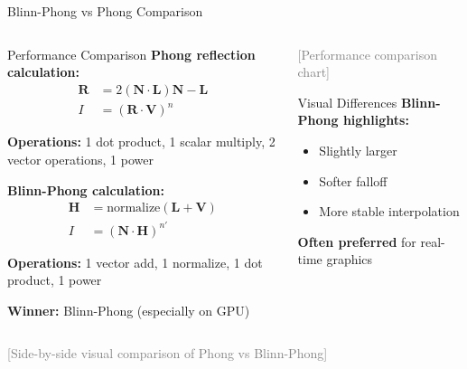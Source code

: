 \begin{frame}{Blinn-Phong vs Phong Comparison}
  \begin{columns}
    \begin{column}{0.5\textwidth}
      \begin{mathbox}{Performance Comparison}
        \textbf{Phong reflection calculation:}
        \begin{align}
          \mathbf{R} &= 2(\mathbf{N} \cdot \mathbf{L})\mathbf{N} - \mathbf{L} \\
          I &= (\mathbf{R} \cdot \mathbf{V})^n
        \end{align}

        \textbf{Operations:} 1 dot product, 1 scalar multiply, 2 vector operations, 1 power

        \vspace{0.3cm}
        \pause
        \textbf{Blinn-Phong calculation:}
        \begin{align}
          \mathbf{H} &= \text{normalize}(\mathbf{L} + \mathbf{V}) \\
          I &= (\mathbf{N} \cdot \mathbf{H})^{n'}
        \end{align}

        \textbf{Operations:} 1 vector add, 1 normalize, 1 dot product, 1 power

        \vspace{0.3cm}
        \pause
        \textbf{Winner:} Blinn-Phong (especially on GPU)
      \end{mathbox}
    \end{column}
    \begin{column}{0.4\textwidth}
      \vspace{1.5cm}
      \textcolor{gray}{[Performance comparison chart]}

      \vspace{0.5cm}
      \begin{conceptbox}{Visual Differences}
        \footnotesize
        \textbf{Blinn-Phong highlights:}
        \begin{itemize}
          \item Slightly larger
          \item Softer falloff
          \item More stable interpolation
        \end{itemize}

        \textbf{Often preferred} for real-time graphics
      \end{conceptbox}
    \end{column}
  \end{columns}

  \vspace{0.3cm}
  \pause
  \textcolor{gray}{[Side-by-side visual comparison of Phong vs Blinn-Phong]}
\end{frame}
